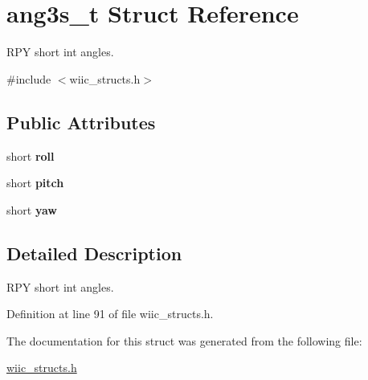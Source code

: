 \hypertarget{structang3s__t}{\section{ang3s\-\_\-t Struct Reference}
\label{structang3s__t}
}


R\-P\-Y short int angles.  




{\ttfamily \#include $<$wiic\-\_\-structs.\-h$>$}

\subsection*{Public Attributes}
\begin{DoxyCompactItemize}
\item 
\hypertarget{structang3s__t_a1cacb79df7b3e902fe82e4b8be991675}{short {\bfseries roll}}\label{structang3s__t_a1cacb79df7b3e902fe82e4b8be991675}

\item 
\hypertarget{structang3s__t_a1c649065f433716dd2e995394a1bd21d}{short {\bfseries pitch}}\label{structang3s__t_a1c649065f433716dd2e995394a1bd21d}

\item 
\hypertarget{structang3s__t_ac387b50cc3ff1813fa564d086f985dc7}{short {\bfseries yaw}}\label{structang3s__t_ac387b50cc3ff1813fa564d086f985dc7}

\end{DoxyCompactItemize}


\subsection{Detailed Description}
R\-P\-Y short int angles. 

Definition at line 91 of file wiic\-\_\-structs.\-h.



The documentation for this struct was generated from the following file\-:\begin{DoxyCompactItemize}
\item 
\hyperlink{wiic__structs_8h}{wiic\-\_\-structs.\-h}\end{DoxyCompactItemize}
